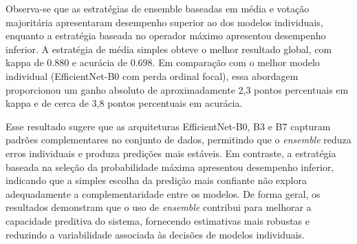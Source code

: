 \begin{table}[!htb]
	\centering
	\caption{Desempenho das diferentes estratégias de ensemble avaliadas no conjunto de teste.}
	\label{tab:ensemble_results}
\end{table}

Observa-se que as estratégias de ensemble baseadas em média e votação majoritária apresentaram desempenho superior ao dos modelos individuais, enquanto a estratégia baseada no operador máximo apresentou desempenho inferior. A estratégia de média simples obteve o melhor resultado global, com kappa de $0.880$ e acurácia de $0.698$. Em comparação com o melhor modelo individual (EfficientNet-B0 com perda ordinal focal), essa abordagem proporcionou um ganho absoluto de aproximadamente 2,3 pontos percentuais em kappa e de cerca de 3,8 pontos percentuais em acurácia.

Esse resultado sugere que as arquiteturas EfficientNet-B0, B3 e B7 capturam padrões complementares no conjunto de dados, permitindo que o \textit{ensemble} reduza erros individuais e produza predições mais estáveis. Em contraste, a estratégia baseada na seleção da probabilidade máxima apresentou desempenho inferior, indicando que a simples escolha da predição mais confiante não explora adequadamente a complementaridade entre os modelos. De forma geral, os resultados demonstram que o uso de \textit{ensemble} contribui para melhorar a capacidade preditiva do sistema, fornecendo estimativas mais robustas e reduzindo a variabilidade associada às decisões de modelos individuais.

